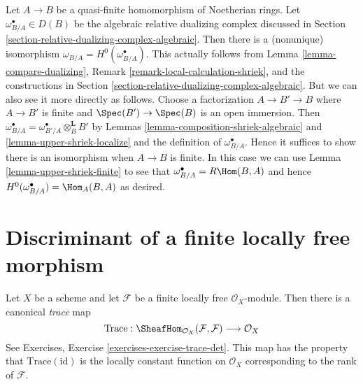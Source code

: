 \begin{remark}
\label{remark-compare-dualizing-algebraic}
Let $A \to B$ be a quasi-finite homomorphism of Noetherian rings.
Let $\omega_{B/A}^\bullet \in D(B)$ be the algebraic relative dualizing
complex discussed in
Section \ref{section-relative-dualizing-complex-algebraic}.
Then there is a (nonunique) isomorphism
$\omega_{B/A} = H^0(\omega_{B/A}^\bullet)$.
This actually follows from
Lemma \ref{lemma-compare-dualizing},
Remark \ref{remark-local-calculation-shriek}, and
the constructions in
Section \ref{section-relative-dualizing-complex-algebraic}.
But we can also see it more directly as follows.
Choose a factorization $A \to B' \to B$
where $A \to B'$ is finite and $\Spec(B') \to \Spec(B)$
is an open immersion. Then
$\omega_{B/A}^\bullet = \omega_{B'/A}^\bullet \otimes_B^\mathbf{L} B'$
by Lemmas \ref{lemma-composition-shriek-algebraic} and
\ref{lemma-upper-shriek-localize} and
the definition of $\omega_{B/A}^\bullet$. Hence
it suffices to show there is an isomorphism when $A \to B$ is finite.
In this case we can use Lemma \ref{lemma-upper-shriek-finite}
to see that $\omega_{B/A}^\bullet = R\Hom(B, A)$ and hence
$H^0(\omega^\bullet_{B/A}) = \Hom_A(B, A)$ as desired.
\end{remark}






\section{Discriminant of a finite locally free morphism}
\label{section-discriminant}

\noindent
Let $X$ be a scheme and let $\mathcal{F}$ be a finite locally
free $\mathcal{O}_X$-module. Then there is a canonical {\it trace} map
$$
\text{Trace} :
\SheafHom_{\mathcal{O}_X}(\mathcal{F}, \mathcal{F})
\longrightarrow
\mathcal{O}_X
$$
See Exercises, Exercise \ref{exercises-exercise-trace-det}. This map has
the property that $\text{Trace}(\text{id})$ is the locally constant function
on $\mathcal{O}_X$ corresponding to the rank of $\mathcal{F}$.


